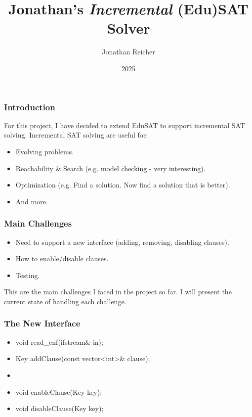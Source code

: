 \documentclass{beamer}
\title{Jonathan's \emph{Incremental} (Edu)SAT Solver}
\author{Jonathan Reicher}
\institute{Technion}
\date{2025}
\begin{document}
\frame{ \titlepage }

\begin{frame}
    \frametitle{Introduction}
    For this project, I have decided to extend EduSAT to support incremental
    SAT solving. Incremental SAT solving are useful for:
    \begin{itemize}
        \item Evolving problems.
        \item Reachability \& Search (e.g. model checking - very interesting).
        \item Optimization (e.g. Find a solution. Now find a solution that is better).
        \item And more.
    \end{itemize}
\end{frame}

\begin{frame}
    \frametitle{Main Challenges}
    \begin{itemize}
        \item Need to support a new interface (adding, removing, disabling clauses).
        \item How to enable/disable clauses.
        \item Testing.
    \end{itemize}
    This are the main challenges I faced in the project so far. I will present
    the current state of handling each challenge.
\end{frame}

\begin{frame}
    \frametitle{The New Interface}
    \begin{itemize}
        \item void read\_cnf(ifstream\& in);
        \item Key addClause(const vector<int>\& clause);
        \item {} 
        \item void enableClause(Key key);
        \item void disableClause(Key key);
    \end{itemize}
\end{frame}
\end{document}
